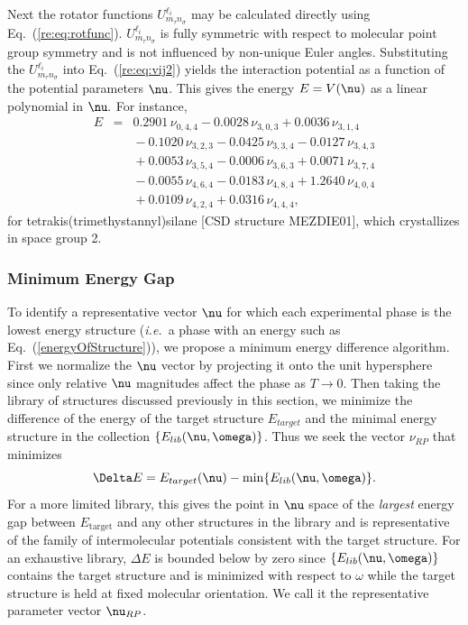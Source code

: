 \documentclass[preprint]{iucr}              %
\newcommand{\mb}[1]{\ensuremath{\mbox{\boldmath $ #1 $}}}
\begin{document}
Next the rotator functions $U^{\ell_i}_{m_\tau n_\sigma}$ may be calculated
directly using Eq.~(\ref{re:eq:rotfunc}).  $U^{\ell_i}_{m_\tau n_\sigma}$ is fully symmetric with
respect to molecular point group symmetry and is not influenced by non-unique
Euler angles. Substituting the $U^{\ell_i}_{m_\tau n_\sigma}$ into
Eq.~(\ref{re:eq:vij2}) yields the interaction potential as a function
of the potential parameters $\mb{\nu}$. This gives the energy
$E=V(\mb{\nu})$ as a linear polynomial in $\mb{\nu}.$   For instance,
\begin{eqnarray}
\label{energyOfStructure} E & = & 0.2901\,\nu_{0,4,4} -
0.0028\,\nu_{3,0,3} +
0.0036\,\nu_{3,1,4}  \nonumber \\
&&{}- 0.1020\,\nu_{3,2,3} - 0.0425\,\nu_{3,3,4} -0.0127\,\nu_{3,4,3}
 \nonumber \\
&&{}+ 0.0053\,\nu_{3,5,4} - 0.0006\,\nu_{3,6,3} +
0.0071\,\nu_{3,7,4}  \nonumber \\
&&{}- 0.0055\,\nu_{4,6,4} - 0.0183\,\nu_{4,8,4}+
1.2640\,\nu_{4,0,4}\nonumber\\
&&{}+ 0.0109\,\nu_{4,2,4} + 0.0316\,\nu_{4,4,4},
\end{eqnarray}
for tetrakis(trimethystannyl)silane  [CSD structure MEZDIE01], which
crystallizes in space group 2.

\subsubsection{Minimum Energy Gap}
\label{Minimum_Energy_Gap}

To identify a representative vector $\mb{\nu}$ for which each
experimental phase is the lowest energy structure (\emph{i.e.}\ a
phase with an energy such as Eq.\ (\ref{energyOfStructure})), we
propose a minimum energy difference algorithm. First we normalize the
$\mb{\nu}$ vector by projecting it onto the unit hypersphere since only relative
$\mb{\nu}$ magnitudes affect the phase as $T\rightarrow 0$. Then
taking the library of structures discussed previously in this
section, we minimize the difference of the energy of the target
structure $E_{target}$ and the minimal energy structure in the
collection $\{E_{lib}(\mb{\nu},\mb{\omega})\}$.  Thus we seek the
vector $\nu_{RP}$ that minimizes
\begin{equation}
\label{Endiff} \Delta E =
E_{target}(\mb{\nu})-\min\{E_{lib}(\mb{\nu},\mb{\omega})\}.
\end{equation}
For a more limited library, this gives the point in $\mb{\nu}$ space of the
\emph{largest}
energy gap between $E_{\mathrm{target}}$ and any other structures in
the library and is representative of the family of intermolecular
potentials consistent with the target structure. For an exhaustive
library, $\Delta E$ is bounded below by zero since
$\{E_{lib}(\mb{\nu},\mb{\omega})\}$ contains the target structure
and is minimized with respect to $\omega$ while the target structure
is held at fixed molecular orientation. We call it the
representative parameter vector $\mb{\nu}_{RP}$.
\end{document}
